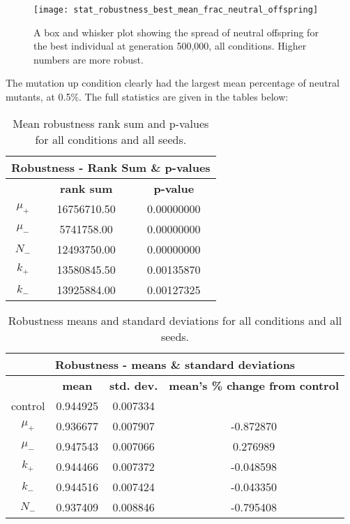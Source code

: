 \begin{figure}[H]
	\centering
	\texttt{[image: stat\_robustness\_best\_mean\_frac\_neutral\_offspring]}
	\caption[Robustness box and whisker plot]{A box and whisker plot showing the spread of neutral offspring for the best individual at generation 500,000, all conditions. Higher numbers are more robust.}
	\label{fig:mean_robustness_all_conditions}
\end{figure}
The mutation up condition clearly had the largest mean percentage of neutral mutants, at 0.5\%. The full statistics are given in the tables below:

\begin{table}
	\begin{tabular}{|c|c|c|}
		\hline
		\multicolumn{3}{c}{\Large \textbf{Robustness - Rank Sum \& p-values}} \\
		\hline
		& \textbf{rank sum} & \textbf{p-value} \\
		\hline
		\hline
		$\mu_+$ & 16756710.50 & 0.00000000 \\ 
		\hline
		$\mu_-$ & 5741758.00 & 0.00000000 \\ 
		\hline
		$N_-$ & 12493750.00 & 0.00000000 \\ 
		\hline
		$k_+$ & 13580845.50 & 0.00135870 \\ 
		\hline
		$k_-$ & 13925884.00 & 0.00127325 \\ 
		\hline
	\end{tabular}
	\caption[Robustness rank sum \& p-values]{Mean robustness rank sum and p-values for all conditions and all seeds.}
	\label{table:rank_sum_p-values}
\end{table}
\begin{table}[H]
	\begin{tabular}{|c|c|c|c|}
		\hline
		\multicolumn{4}{c}{\Large \textbf{Robustness - means \& standard deviations}} \\
		\hline
		& \textbf{mean} & \textbf{std. dev.} & \textbf{mean's \% change from control} \\
		\hline
		control & 0.944925 & 0.007334 & \textemdash \\ 
		\hline
		$\mu_+$ & 0.936677 & 0.007907 & -0.872870 \\ 
		\hline
		$\mu_-$ & 0.947543 & 0.007066 & 0.276989 \\ 
		\hline
		$k_+$ & 0.944466 & 0.007372 & -0.048598 \\ 
		\hline
		$k_-$ & 0.944516 & 0.007424 & -0.043350 \\ 
		\hline
		$N_-$ & 0.937409 & 0.008846 & -0.795408 \\ 
		\hline
	\end{tabular}
	\caption[Robustness means and standard deviations]{Robustness means and standard deviations for all conditions and all seeds.}
	\label{table:robustness_means_and_std_dev}
\end{table}


